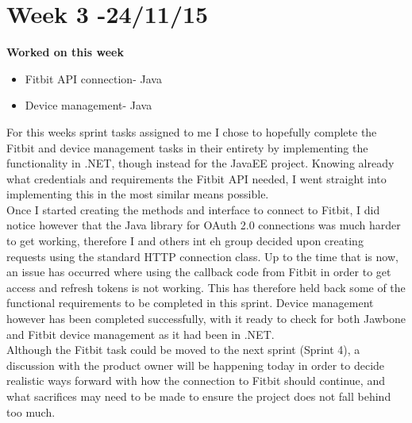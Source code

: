 \section{Week 3 -24/11/15}
\textbf{Worked on this week}
\begin{itemize}
\item Fitbit API connection- Java
\item Device management- Java
\end{itemize}
For this weeks sprint tasks assigned to me I chose to hopefully complete the Fitbit and device management tasks in their entirety by implementing the functionality in .NET, though instead for the JavaEE project. Knowing already what credentials and requirements the Fitbit API needed, I went straight into implementing this in the most similar means possible. \\
Once I started creating the methods and interface to connect to Fitbit, I did notice however that the Java library for OAuth 2.0 connections was much harder to get working, therefore I and others int eh group decided upon creating requests using the standard HTTP connection class. Up to the time that is now, an issue has occurred where using the callback code from Fitbit in order to get access and refresh tokens is not working. This has therefore held back some of the functional requirements to be completed in this sprint.
Device management however has been completed successfully, with it ready to check for both Jawbone and Fitbit device management as it had been in .NET.\\
Although the Fitbit task could be moved to the next sprint (Sprint 4), a discussion with the product owner will be happening today in order to decide realistic ways forward with how the connection to Fitbit should continue, and what sacrifices may need to be made to ensure the project does not fall behind too much.

